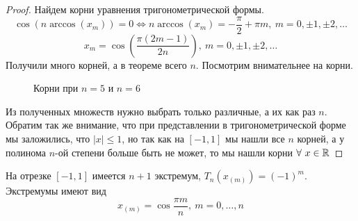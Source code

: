 \begin{proof} Найдем корни уравнения тригонометрической формы.
  \[\cos(n\arccos(x_m))=0 \Leftrightarrow n\arccos(x_m)=-\frac{\pi}{2}+\pi m,\ m=0,\pm1,\pm2,\ldots\]
  \[x_m=\cos\left(\frac{\pi(2m-1)}{2n}\right),\ m=0,\pm1,\pm2,\ldots\]
  Получили много корней, а в теореме всего $n$. Посмотрим внимательнее на корни.

  \begin{figure}[h]
    \centering
    \begin{minipage}{.5\linewidth}
      \centering
    \end{minipage}\hfill
    \begin{minipage}{.5\linewidth}
      \centering
    \end{minipage}
    \caption[odd]{Корни при $n=5$ и $n=6$}
  \end{figure}

  Из полученных множеств нужно выбрать только различные, а их как раз $n$.
  Обратим так же внимание, что при представлении в тригонометрической
  форме мы заложились, что $|x|\leq1$, но так как на $[-1,1]$ мы нашли все $n$
  корней, а у полинома $n$-ой степени больше быть не может, то мы нашли корни $\forall\ x\in \mathbb{R}$
\end{proof}

\begin{theorem}
  На отрезке $[-1,1]$ имеется $n+1$ экстремум, $T_n(x_{(m)})=(-1)^m$. Экстремумы имеют вид
  \[x_{(m)}=\cos\frac{\pi m}{n},\ m=0,\ldots,n\]
\end{theorem}

